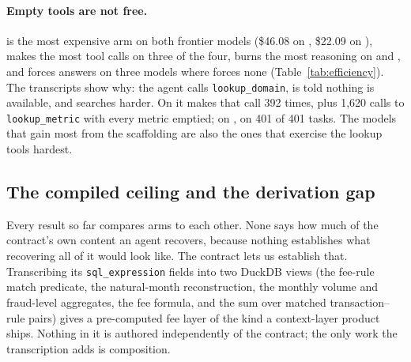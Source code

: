 \paragraph{Empty tools are not free.} \armH{} is the most expensive arm on
both frontier models (\$46.08 on \mSON{}, \$22.09 on \mGPT{}), makes the
most tool calls on three of the four, burns the most reasoning on \mGLM{}
and \mSON{}, and forces answers on three models where \armC{} forces none
(Table~\ref{tab:efficiency}). The transcripts show why: the agent calls
\texttt{lookup\_domain}, is told nothing is available, and searches harder.
On \mSON{} it makes that call 392 times, plus 1{,}620 calls to
\texttt{lookup\_metric} with every metric emptied; on \mGPT{}, on 401 of
401 tasks. The
models that gain most from the scaffolding are also the ones that exercise
the lookup tools hardest.

\subsection{The compiled ceiling and the derivation gap}
\label{sec:ceiling}

Every result so far compares arms to each other. None says how much of the
contract's own content an agent recovers, because nothing establishes what
recovering all of it would look like. The contract lets us establish that.
Transcribing its \texttt{sql\_expression} fields into two DuckDB views (the
fee-rule match predicate, the natural-month reconstruction, the monthly
volume and fraud-level aggregates, the fee formula, and the sum over matched
transaction--rule pairs) gives a pre-computed fee layer of the kind a
context-layer product ships. Nothing in it is authored independently of the
contract; the only work the transcription adds is composition.

